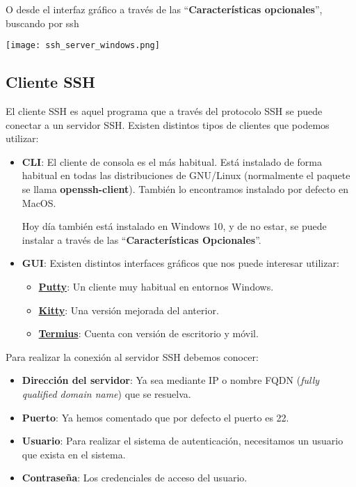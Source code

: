 O desde el interfaz gráfico a través de las “\textbf{Características opcionales}”, buscando por ssh
\begin{center}
    \texttt{[image: ssh\_server\_windows.png]}
\end{center}


\subsection{Cliente SSH}
El cliente SSH es aquel programa que a través del protocolo SSH se puede conectar a un servidor SSH. Existen distintos tipos de clientes que podemos utilizar:

\begin{itemize}
    \item \textbf{CLI}: El cliente de consola es el más habitual. Está instalado de forma habitual en todas las distribuciones de GNU/Linux (normalmente el paquete se llama \textbf{openssh-client}). También lo encontramos instalado por defecto en MacOS.

    Hoy día también está instalado en Windows 10, y de no estar, se puede instalar a través de las “\textbf{Características Opcionales}”.

    \item \textbf{GUI}: Existen distintos interfaces gráficos que nos puede interesar utilizar:
    \begin{itemize}
        \item \textbf{\href{https://putty.org/}{Putty}}: Un cliente muy habitual en entornos Windows.
        \item \textbf{\href{https://github.com/cyd01/KiTTY/}{Kitty}}: Una versión mejorada del anterior.
        \item \textbf{\href{https://www.termius.com/}{Termius}}: Cuenta con versión de escritorio y móvil.
    \end{itemize}
\end{itemize}


Para realizar la conexión al servidor SSH debemos conocer:

\begin{itemize}
    \item \textbf{Dirección del servidor}: Ya sea mediante IP o nombre FQDN (\textit{fully qualified domain name}) que se resuelva.
    \item \textbf{Puerto}: Ya hemos comentado que por defecto el puerto es 22.
    \item \textbf{Usuario}: Para realizar el sistema de autenticación, necesitamos un usuario que exista en el sistema.
    \item \textbf{Contraseña}: Los credenciales de acceso del usuario.
\end{itemize}

